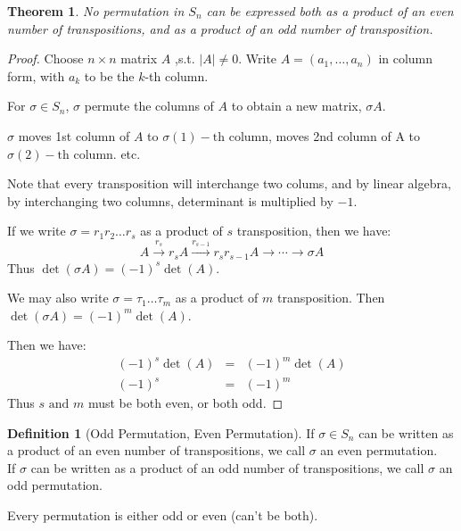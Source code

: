 \documentclass{article}
\theoremstyle{MyNonumberplain}
\theoremstyle{break}
\newtheorem*{proof}{Proof. }
\newcommand{\infixand}{\text{ and }}
\newcommand{\tmop}{\text}
\theoremstyle{break}
\newtheorem{theorem}{Theorem}[section]
\theoremstyle{break}
\theoremstyle{definition}
\theoremstyle{break}
\newtheorem{definition}{Definition}[section]
\begin{document}
\begin{thmbox}
    \begin{theorem}
        No permutation in $S_n$ can be expressed both as a product of an even number of transpositions, and as a product of an odd number of transposition.
    \end{theorem}

    \begin{prfbox}
        \begin{proof}
            Choose $n \times n$ matrix $A$ ,s.t. $| A | \neq 0$. Write $A = (a_1, \ldots,
            a_n)$ in column form, with $a_k$ to be the $k$-th column.\bigskip

            For $\sigma \in S_n$, $\sigma$ permute the columns of $A$ to obtain a new
            matrix, $\sigma A$.\bigskip

            $\sigma$ moves 1st column of $A$ to $\sigma (1) - \tmop{th}$ column, moves 2nd
            column of A to $\sigma (2) - \tmop{th}$ column. etc.\bigskip

            Note that every transposition will interchange two colums, and by linear
            algebra, by interchanging two columns, determinant is multiplied by $- 1$.\bigskip

            If we write $\sigma = r_1 r_2 \ldots r_s$ as a product of $s$ transposition,
            then we have:
            \[ A \xrightarrow{r_s} r_s A \xrightarrow{r_{s - 1}} r_s r_{s - 1} A
            \rightarrow \cdots \rightarrow \sigma A \]
            Thus $\det (\sigma A) = (- 1)^s \det (A)$.\bigskip

            We may also write $\sigma = \tau_1 \ldots \tau_m$ as a product of $m$
            transposition. Then $\det (\sigma A) = (- 1)^m \det (A)$.\bigskip

            Then we have:
            \begin{eqnarray*}
            (- 1)^s \det (A) & = & (- 1)^m \det (A)\\
            (- 1)^s & = & (- 1)^m
            \end{eqnarray*}
            Thus $s \infixand m$ must be both even, or both odd.
        \end{proof}
    \end{prfbox}
\end{thmbox}

\begin{defbox}
    \begin{definition}[Odd Permutation, Even Permutation]
        If $\sigma\in S_n$ can be written as a product of an even number of transpositions, we
        call $\sigma$ an even permutation. \\
        
        If $\sigma$ can be written as a product of an odd number of transpositions,
        we call $\sigma$ an odd permutation.\bigskip

        Every permutation is either odd or even (can't be both).
    \end{definition}
\end{defbox}
\end{document}
